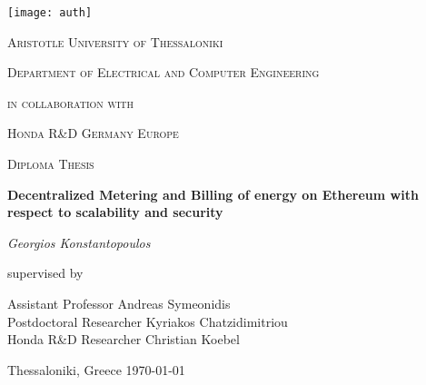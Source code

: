\begin{titlepage}
	\centering
	\texttt{[image: auth]}\par\vspace{1cm}
	{\scshape\LARGE Aristotle University of Thessaloniki \par}
	{\scshape\Large Department of Electrical and Computer Engineering\par}
	\vspace{1cm}
	{\scshape\Large in collaboration with \par}
	{\scshape\LARGE Honda R\&D Germany Europe \par}
	\vspace{1cm}
	{\scshape\Large Diploma Thesis\par}
	\vspace{1.5cm}
	{\huge\bfseries Decentralized Metering and Billing of energy on Ethereum with respect to scalability and security \par}
	\vspace{2cm}
	{\Large\itshape Georgios Konstantopoulos\par}
	\vfill
	supervised by\par
	Assistant Professor Andreas Symeonidis\\
	Postdoctoral Researcher Kyriakos Chatzidimitriou\\
	Honda R\&D Researcher Christian Koebel 

	\vfill

	{\large Thessaloniki, Greece \today\par}
\end{titlepage}